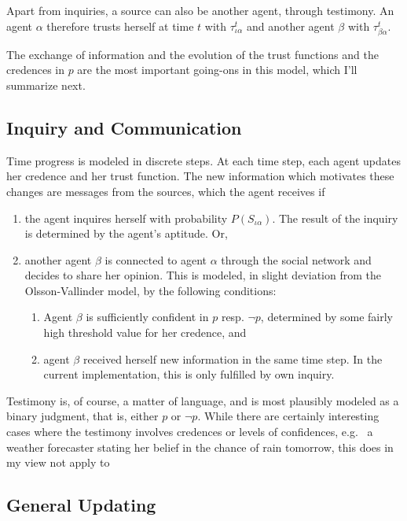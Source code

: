 \documentclass[11pt, a4paper]{scrartcl}
\begin{document}
Apart from inquiries, a source can also be another agent, through testimony. An agent $\alpha$ therefore trusts herself at time $t$ with $\tau^t_{\iota\alpha}$ and another agent $\beta$ with $\tau^t_{\beta\alpha}$.

The exchange of information and the evolution of the trust functions and the credences in $p$ are the most important going-ons in this model, which I'll summarize next.

\subsection{Inquiry and Communication} 

Time progress is modeled in discrete steps. At each time step, each agent updates her credence and her trust function. The new information which motivates these changes are messages from the sources, which the agent receives if
\begin{enumerate}[label = (\roman*)]
    \item the agent inquires herself with probability $P(S_{\iota\alpha})$. The result of the inquiry is determined by the agent's aptitude. Or,
    \item another agent $\beta$ is connected to agent $\alpha$ through the social network and decides to share her opinion. This is modeled, in slight deviation from the Olsson-Vallinder model, by the following conditions: 
        \begin{enumerate}[label = (\alph*)]
            \item Agent $\beta$ is sufficiently confident in $p$ resp. $\neg p$, determined by some fairly high threshold value for her credence, and
            \item agent $\beta$ received herself new information in the same time step. In the current implementation, this is only fulfilled by own inquiry.  
        \end{enumerate}
\end{enumerate}

Testimony is, of course, a matter of language, and is most plausibly modeled as a binary judgment, that is, either $p$ or $\neg p$. While there are certainly interesting cases where the testimony involves credences or levels of confidences, e.g. \ a weather forecaster stating her belief in the chance of rain tomorrow, this does in my view not apply to  

\subsection{General Updating}
\end{document}
